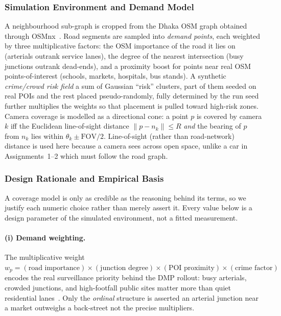 \documentclass{ai-lab-report}
\begin{document}
\subsubsection{Simulation Environment and Demand Model}
A neighbourhood sub-graph is cropped from the Dhaka OSM graph obtained through OSMnx~\citep{boeing2017osmnx}. Road segments are sampled into \emph{demand points}, each weighted by three multiplicative factors: the OSM importance of the road it lies on (arterials outrank service lanes), the degree of the nearest intersection (busy junctions outrank dead-ends), and a proximity boost for points near real OSM points-of-interest (schools, markets, hospitals, bus stands). A synthetic \emph{crime/crowd risk field} a sum of Gaussian ``risk'' clusters, part of them seeded on real POIs and the rest placed pseudo-randomly, fully determined by the run seed further multiplies the weights so that placement is pulled toward high-risk zones. Camera coverage is modelled as a directional cone: a point $p$ is covered by camera $k$ iff the Euclidean line-of-sight distance $\lVert p-n_k\rVert\le R$ \emph{and} the bearing of $p$ from $n_k$ lies within $\theta_k\pm\text{FOV}/2$. Line-of-sight (rather than road-network) distance is used here because a camera sees across open space, unlike a car in Assignments~1--2 which must follow the road graph.

\subsubsection{Design Rationale and Empirical Basis}
\label{sec:a3defend}

A coverage model is only as credible as the reasoning behind its terms, so we justify each numeric choice rather than merely assert it. Every value below is a design parameter of the simulated environment, not a fitted measurement.

\paragraph{(i) Demand weighting.} The multiplicative weight $w_p = (\text{road importance})\times(\text{junction degree})\times(\text{POI proximity})\times(\text{crime factor})$ encodes the real surveillance priority behind the DMP rollout: busy arterials, crowded junctions, and high-footfall public sites matter more than quiet residential lanes~\citep{tbs2023cctv,dailystar2023cctv}. Only the \emph{ordinal} structure is asserted an arterial junction near a market outweighs a back-street not the precise multipliers.
\end{document}
